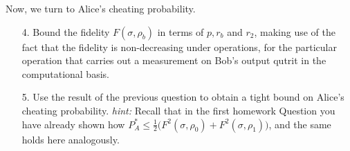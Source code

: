 \begin{exercises}
\begin{enumerate}
\end{enumerate}
Now, we turn to Alice's cheating probability.
\begin{enumerate}
\item[4.] Bound the fidelity $F(\sigma, \rho_b)$ in terms of $p, r_b$ and $r_2$, making use of the fact that the fidelity is non-decreasing under operations, for the particular operation that carries out a measurement on Bob's output qutrit in the computational basis.
\item[5.] Use the result of the previous question to obtain a tight bound on Alice's cheating probability. \textit{hint:} Recall that in the first homework Question you have already shown how $P_A^* \leq \frac{1}{2} \big( F^2(\sigma, \rho_0) + F^2(\sigma, \rho_1) \big)$, and the same holds here analogously.

\end{enumerate}
\end{exercises}
